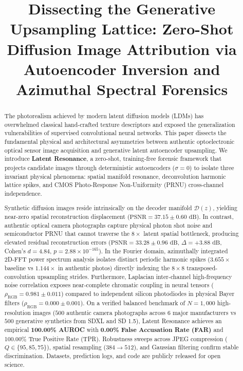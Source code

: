 \documentclass[conference]{IEEEtran}
\title{Dissecting the Generative Upsampling Lattice: Zero-Shot Diffusion Image Attribution via Autoencoder Inversion and Azimuthal Spectral Forensics}
\author{
\IEEEauthorblockN{Anonymous Authors}
\IEEEauthorblockA{IEEE WACV 2027 Workshops on Synthetic Media and Vision Safety\\
Paper under double-blind peer review\\
Email: anonymous@wacv2027.org}
}
\begin{document}
\maketitle

\begin{abstract}
The photorealism achieved by modern latent diffusion models (LDMs) has overwhelmed classical hand-crafted texture descriptors and exposed the generalization vulnerabilities of supervised convolutional neural networks. This paper dissects the fundamental physical and architectural asymmetries between authentic optoelectronic optical sensor image acquisition and generative latent autoencoder upsampling. We introduce \textbf{Latent Resonance}, a zero-shot, training-free forensic framework that projects candidate images through deterministic autoencoders ($\sigma = 0$) to isolate three invariant physical phenomena: spatial manifold resonance, deconvolution harmonic lattice spikes, and CMOS Photo-Response Non-Uniformity (PRNU) cross-channel independence.

Synthetic diffusion images reside intrinsically on the decoder manifold $\mathcal{D}(z)$, yielding near-zero spatial reconstruction displacement ($\text{PSNR} = 37.15 \pm 0.60\text{ dB}$). In contrast, authentic optical camera photographs capture physical photon shot noise and semiconductor PRNU that cannot traverse the $8\times$ latent spatial bottleneck, producing elevated residual reconstruction errors ($\text{PSNR} = 33.28 \pm 0.96\text{ dB}$, $\Delta = +3.88\text{ dB}$, Cohen's $d = 4.84$, $p = 2.88 \times 10^{-165}$). In the Fourier domain, azimuthally integrated 2D-FFT power spectrum analysis isolates distinct periodic harmonic spikes ($3.655\times$ baseline vs $1.144\times$ in authentic photos) directly indexing the $8\times 8$ transposed-convolution upsampling strides. Furthermore, Laplacian inter-channel high-frequency noise correlation exposes near-complete chromatic coupling in neural tensors ($\rho_{\text{RGB}} = 0.981 \pm 0.011$) compared to independent silicon photodiodes in physical Bayer filters ($\rho_{\text{RGB}} = 0.000 \pm 0.001$). On a verified balanced benchmark of $N=1,000$ high-resolution images ($500$ authentic camera photographs across 6 major manufacturers vs $500$ generative synthetics from SDXL and SD 1.5), Latent Resonance achieves an empirical \textbf{100.00\% AUROC} with \textbf{0.00\% False Accusation Rate (FAR)} and 100.00\% True Positive Rate (TPR). Robustness sweeps across JPEG compression ($Q \in \{95, 85, 75\}$), spatial resampling ($384 \to 512$), and Gaussian filtering confirm stable discrimination. Datasets, prediction logs, and code are publicly released for open science.
\end{abstract}
\end{document}
